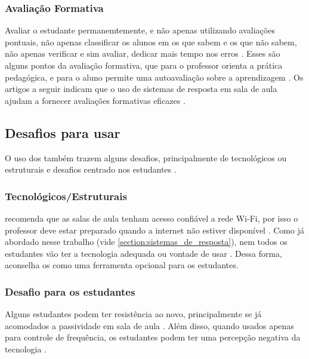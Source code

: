 \subsubsection{Avaliação Formativa}
Avaliar o estudante permanemtemente, e não apenas utilizando avaliações pontuais,
não apenas classificar os alunos em os que sabem e os que não sabem, não apenas
verificar e sim avaliar, dedicar mais tempo nos erros \cite{UnivespTV2013}. Esses são alguns pontos
da avaliação formativa, que para o professor orienta a prática pedagógica, e para
o aluno permite uma autoavaliação sobre a aprendizagem \cite{Kay2009}. Os artigos
a seguir indicam que o uso de sistemas de resposta em sala de aula ajudam a
fornecer avaliações formativas eficazes \cite{Kortemeyer2016, Thampy2014, Kay2009, Fies2006}.

\subsection{Desafios para usar {\clickers}}
O uso dos {\clickers} também trazem alguns desafios, principalmente
de tecnológicos ou estruturais e desafios centrado nos estudantes \cite{Cubric2015, Kay2009}.

\subsubsection{Tecnológicos/Estruturais}
 recomenda que as salas de aula tenham acesso confiável
a rede Wi-Fi, por isso o professor deve estar preparado quando a internet não
estiver disponível \cite{Strasser2010}. Como já abordado nesse trabalho (vide \autoref{section:sistemas_de_resposta}),
nem todos os estudantes vão ter a tecnologia adequada ou vontade de usar \cite{Morrell2015, Stowell2015}.
Dessa forma,  aconselha os {\clickers} como uma ferramenta opcional para
os estudantes.

\subsubsection{Desafio para os estudantes}
Alguns estudantes podem ter resistência ao novo, principalmente se já acomodados
a passividade em sala de aula \cite{Terrion2012, Kay2009}. Além disso, quando
usados apenas para controle de frequência, os estudantes podem ter uma percepção
negativa da tecnologia \cite{Terrion2012, Caldwell2007}.
